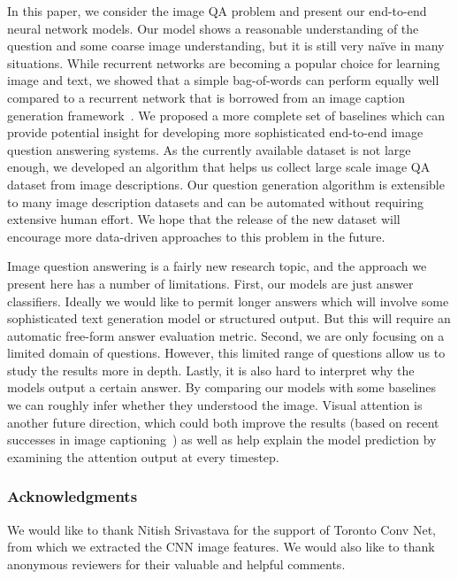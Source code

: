 In this paper, we consider the image QA problem and present our end-to-end
neural network models. Our model shows a reasonable understanding of the
question and some coarse image understanding, but it is still very na\"{i}ve in
many situations. While recurrent networks are becoming a popular choice for
learning image and text, we showed that a simple bag-of-words can perform equally
well compared to a recurrent network that is borrowed from an image caption
generation framework~\cite{vinyals14}. We proposed a more complete set of
baselines which can provide potential insight for developing more sophisticated
end-to-end image question answering systems. As the currently available dataset
is not large enough, we developed an algorithm that helps us collect large scale
image QA dataset from image descriptions. Our question generation algorithm is
extensible to many image description datasets and can be automated without
requiring extensive human effort. We hope that the release of the new dataset
will encourage more data-driven approaches to this problem in the future.

Image question answering is a fairly new research topic, and the approach we
present here has a number of limitations. First, our models are just answer
classifiers. Ideally we would like to permit longer answers which will involve
some sophisticated text generation model or structured output. But this will
require an automatic free-form answer evaluation metric. Second, we are only
focusing on a limited domain of questions. However, this limited range of
questions allow us to study the results more in depth. Lastly, it is also hard
to interpret why the models output a certain answer. By comparing our models with
some baselines we can roughly infer whether they understood the image.
Visual attention is another future direction, which could both improve the
results (based on recent successes in image captioning~\cite{xu15}) as well as
help explain the model prediction by examining the attention output at every
timestep.

\subsubsection*{Acknowledgments}

We would like to thank Nitish Srivastava for the support of Toronto Conv Net,
from which we extracted the CNN image features. We would also like to thank
anonymous reviewers for their valuable and helpful comments.

\begin{small}


\end{small}
